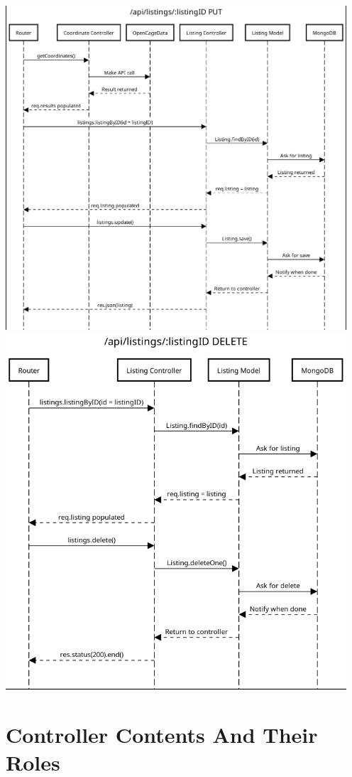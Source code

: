 \documentclass[notitlepage]{article}
\begin{document}
\begin{center}
		\includegraphics[width=5in]{update.png}
		\includegraphics[width=5in]{delete.png}
	\end{center}

\section{Controller Contents And Their Roles}
\end{document}

